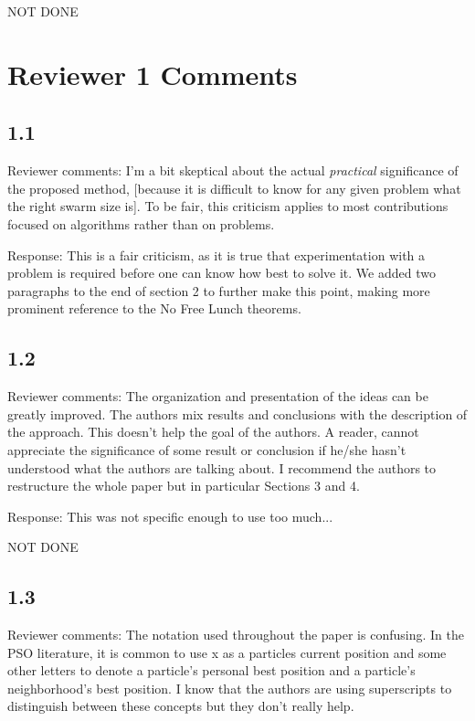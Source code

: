 \documentclass[onecolumn, 12pt]{article}
\begin{document}
NOT DONE

\section*{Reviewer 1 Comments}

\subsection*{1.1}

Reviewer comments: I'm a bit skeptical about the actual \emph{practical}
significance of the proposed method, [because it is difficult to know for any
given problem what the right swarm size is]. To be fair, this criticism applies
to most contributions focused on algorithms rather than on problems.

Response: This is a fair criticism, as it is true that experimentation with a
problem is required before one can know how best to solve it.  We added two
paragraphs to the end of section 2 to further make this point, making more
prominent reference to the No Free Lunch theorems.

\subsection*{1.2}

Reviewer comments: The organization and presentation of the ideas can be
greatly improved. The authors mix results and conclusions with the description
of the approach. This doesn't help the goal of the authors. A reader, cannot
appreciate the significance of some result or conclusion if he/she hasn't
understood what the authors are talking about. I recommend the authors to
restructure the whole paper but in particular Sections 3 and 4.

Response: This was not specific enough to use too much...

NOT DONE

\subsection*{1.3}

Reviewer comments: The notation used throughout the paper is confusing. In the
PSO literature, it is common to use x as a particles current position and some
other letters to denote a particle's personal best position and a particle's
neighborhood's best position. I know that the authors are using superscripts to
distinguish between these concepts but they don't really help.
\end{document}
